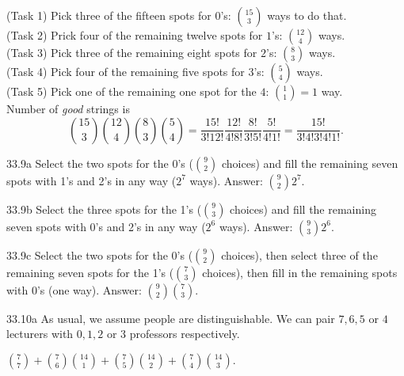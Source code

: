 \begin{Solution}{33.8}

(Task 1) Pick three of the fifteen spots for $0$'s: $\binom{15}{3}$ ways to do that.\\
(Task 2) Prick four of the remaining twelve spots for $1$'s: $\binom{12}{4}$ ways.\\
(Task 3) Pick three of the remaining eight spots for $2$'s: $\binom{8}{3}$ ways.\\
(Task 4) Pick four of the remaining five spots for $3$'s: $\binom{5}{4}$ ways.\\
(Task 5) Pick one of the remaining one spot for the $4$: $\binom{1}{1} =1$ way.\\

Number of {\it good} strings is 
\[
\binom{15}{3}\binom{12}{4}\binom{8}{3}\binom{5}{4}
= \frac{15!}{3!12!}\frac{12!}{4!8!}\frac{8!}{3!5!}\frac{5!}{4!1!} = \frac{15!}{3!4!3!4!1!}.
\]

\end{Solution}

\begin{Solution}{33.9a}
Select the two spots for the 0's ($\binom{9}{2}$ choices) and fill the remaining seven spots with 1's and 2's in any way ($2^{7}$ ways).
Answer: $\binom{9}{2}2^{7}$.
\end{Solution}

\begin{Solution}{33.9b}
Select the three spots for the 1's ($\binom{9}{3}$ choices) and fill the remaining seven spots with 0's and 2's in any way ($2^{6}$ ways).
Answer: $\binom{9}{3}2^{6}$.
\end{Solution}

\begin{Solution}{33.9c}
Select the two spots for the 0's ($\binom{9}{2}$ choices), then select three of the remaining seven spots for the 1's ($\binom{7}{3}$ choices),
then fill in the remaining spots with 0's (one way). Answer: $\binom{9}{2}\binom{7}{3}$.


\end{Solution}
\begin{Solution}{33.10a}
As usual, we assume people are distinguishable.
We can pair $7,6,5$ or $4$ lecturers with $0,1,2$ or $3$ professors respectively.

$\binom{7}{7} + \binom{7}{6}\binom{14}{1} + \binom{7}{5}\binom{14}{2} + \binom{7}{4}\binom{14}{3}.$

\end{Solution}

